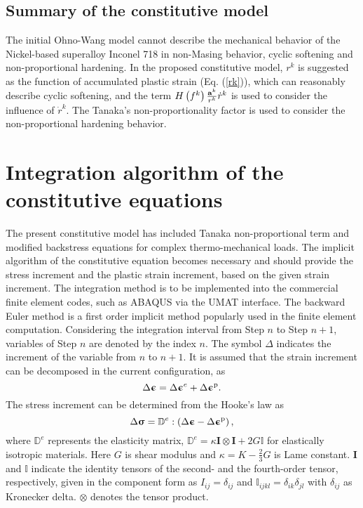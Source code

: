 \documentclass[preprint,5p,twocolumn,11pt,sort&compress]{elsarticle}
\newcommand{\bfsigma}{{\bm{\upsigma}}}
\newcommand{\bfepsilon}{{\bm{\upepsilon}}}
\newcommand{\bfa}{{\bf a}}
\begin{document}
\subsection{Summary of the constitutive model}
\noindent
The initial Ohno-Wang model cannot describe the mechanical behavior of the Nickel-based superalloy Inconel 718 in non-Masing behavior, cyclic softening and non-proportional hardening. In the proposed constitutive model, $r^k$ is suggested as the function of accumulated plastic strain (Eq. (\ref{rk})), which can reasonably describe cyclic softening, and the term $H\left( {f^k} \right)\frac{\bfa^k}{r^k}{\dot r^k}$ is used to consider the influence of ${\dot r^k}$. The Tanaka's non-proportionality factor is used to consider the non-proportional hardening behavior.

\section{Integration algorithm of the constitutive equations}
\noindent
The present constitutive model has included Tanaka non-proportional term and modified backstress equations for complex thermo-mechanical loads. The implicit algorithm of the constitutive equation becomes necessary and should provide the stress increment and the plastic strain increment, based on the given strain increment. The integration method is to be implemented into the commercial finite element codes, such as ABAQUS via the UMAT interface.
The backward Euler method is a first order implicit method popularly used in the finite element computation. Considering the integration interval from Step $n$ to Step $n+1$, variables of Step $n$ are denoted by the index $n$. The symbol $\Delta$ indicates the increment of the variable from $n$ to $n+1$. It is assumed that the strain increment can be decomposed in the current configuration, as
\begin{equation}
{\Delta\bfepsilon} = \Delta\bfepsilon^e + \Delta\bfepsilon^{\rm p}.
\end{equation}
The stress increment can be determined from the Hooke's law as
\begin{equation}
\label{Equ:sigman+1}
\Delta\bfsigma= {\mathbb{D}^e}:\left( {{\Delta\bfepsilon} - \Delta\bfepsilon^{\rm p}} \right),
\end{equation}
where $\mathbb{D}^e$ represents the elasticity matrix, ${\mathbb{D}^e} = \kappa {\mathbf{I}} \otimes {\mathbf{I}} + 2G\mathbb{I}$ for elastically isotropic materials. Here $G$ is shear modulus and  $\kappa  = K - \frac{2}{3}G$  is Lame constant. ${\mathbf{I}}$ and $\mathbb{I}$ indicate the identity tensors of the second- and the fourth-order tensor, respectively, given in the component form as ${I_{ij}} = {\delta _{ij}}$ and ${\mathbb{I}_{ijkl}} = {\delta _{ik}}{\delta _{jl}}$ with ${\delta _{ij}}$ as Kronecker delta. $\otimes$ denotes the tensor product.
\end{document}
